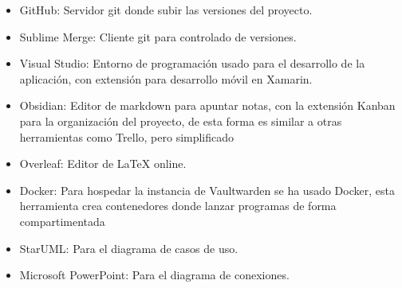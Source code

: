 \begin{itemize}
    \item GitHub:
    Servidor git donde subir las versiones del proyecto.
    \item Sublime Merge:
    Cliente git para controlado de versiones.
    \item Visual Studio:
    Entorno de programación usado para el desarrollo de la aplicación, con extensión para desarrollo móvil en Xamarin.
    \item Obsidian:
    Editor de markdown para apuntar notas, con la extensión Kanban para la organización del proyecto, de esta forma es similar a otras herramientas como Trello, pero simplificado
    \item Overleaf:
    Editor de LaTeX online.
    \item Docker:
    Para hospedar la instancia de Vaultwarden se ha usado Docker, esta herramienta crea contenedores donde lanzar programas de forma compartimentada
    \item StarUML:
    Para el diagrama de casos de uso.
    \item Microsoft PowerPoint:
    Para el diagrama de conexiones.
\end{itemize}